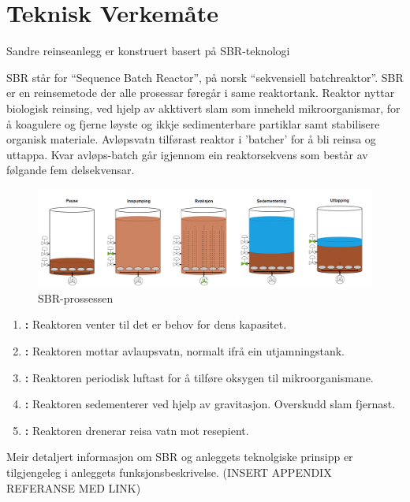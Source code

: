 \newpage
\section{Teknisk Verkemåte}
\thispagestyle{fancy}
Sandre reinseanlegg er konstruert basert på SBR-teknologi

\gls{SBR} står for ``Sequence Batch Reactor'', på norsk ``sekvensiell batchreaktor''.\newline
\gls{SBR} er en reinsemetode der alle prosessar føregår i same reaktortank. 
Reaktor nyttar biologisk reinsing, ved hjelp av akktivert slam som inneheld mikroorganismar, for å koagulere 
og fjerne løyste og ikkje sedimenterbare partiklar samt stabilisere organisk materiale. 
Avløpsvatn tilførast reaktor i 'batcher' for å bli reinsa og uttappa. 
Kvar avløps-batch går igjennom ein reaktorsekvens som består av følgande fem delsekvensar.
\newline

\begin{figure}[htbp]
    \centering
    \includegraphics[width=1\textwidth]{Figurar/SBR-V2.png}
    \caption{\gls{SBR}-prossessen}\label{fig:SBR-Prosessen}
\end{figure}


\begin{enumerate}
    \item \textbf{:} Reaktoren venter til det er behov for dens kapasitet.
    \item \textbf{:} Reaktoren mottar avlaupsvatn, normalt ifrå ein utjamningstank.
    \item \textbf{:} Reaktoren periodisk luftast for å tilføre oksygen til mikroorganismane.
    \item \textbf{:} Reaktoren sedementerer ved hjelp av gravitasjon. Overskudd slam fjernast.
    \item \textbf{:} Reaktoren drenerar reisa vatn mot resepient.
\end{enumerate}

Meir detaljert informasjon om \gls{SBR} og anleggets teknolgiske prinsipp er tilgjengeleg i anleggets
funksjonsbeskrivelse. (INSERT APPENDIX REFERANSE MED LINK)

